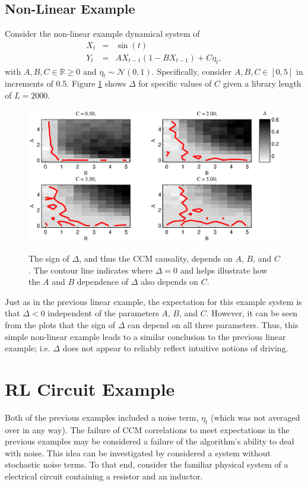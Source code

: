 \documentclass[twocolumn,aps,pre,groupedaddress]{revtex4-1}
\begin{document}
\subsection{Non-Linear Example}
Consider the non-linear example dynamical system of
\begin{eqnarray}
\label{eqn:nonlinearEX}
X_t &=& \sin(t)\\
Y_t &=& AX_{t-1}\left(1-BX_{t-1}\right)+C\eta_t,
\end{eqnarray}
with $A,B,C\in\mathbb{R}\ge 0$ and $\eta_t\sim\mathcal{N}\left(0,1\right)$.  Specifically, consider $A,B,C\in[0,5]$ in increments of 0.5.  Figure \ref{fig:nonlinearex} shows $\Delta$ for specific values of $C$ given a library length of $L=2000$.
\begin{figure}[ht]
\includegraphics[scale=0.5]{NonLinearEx.eps} \\
\caption{The sign of $\Delta$, and thus the CCM causality, depends on $A$, $B$, and $C$. The contour line indicates where $\Delta=0$ and helps illustrate how the $A$ and $B$ dependence of $\Delta$ also depends on $C$.}
\label{fig:nonlinearex}
\end{figure}
Just as in the previous linear example, the expectation for this example system is that $\Delta<0$ independent of the parameters $A$, $B$, and $C$.  However, it can be seen from the plots that the sign of $\Delta$ can depend on all three parameters.  Thus, this simple non-linear example leads to a similar conclusion to the previous linear example; i.e. $\Delta$ does not appear to reliably reflect intuitive notions of driving.

\section{RL Circuit Example}
\label{sec:rlcirc}
Both of the previous examples included a noise term, $\eta_t$ (which was not averaged over in any way).  The failure of CCM correlations to meet expectations in the previous examples may be considered a failure of the algorithm's ability to deal with noise.  This idea can be investigated by considered a system without stochastic noise terms.  To that end, consider the familiar physical system of a electrical circuit containing a resistor and an inductor.
\end{document}
